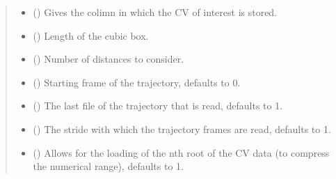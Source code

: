 \documentclass[a4paper,10pt,english]{report}
\begin{document}
\begin{fulllineitems}
\begin{quote}
\begin{description}
\begin{itemize}
\item {} 
\sphinxAtStartPar
{} () \textendash{} Gives the colimn in which the CV of interest is stored.

\item {} 
\sphinxAtStartPar
{} () \textendash{} Length of the cubic box.

\item {} 
\sphinxAtStartPar
{} () \textendash{} Number of distances to consider.

\item {} 
\sphinxAtStartPar
{} (\sphinxstyleliteralemphasis{\sphinxupquote{, }}) \textendash{} Starting frame of the trajectory, defaults to 0.

\item {} 
\sphinxAtStartPar
{} (\sphinxstyleliteralemphasis{\sphinxupquote{, }}) \textendash{} The last file of the trajectory that is read, defaults to \sphinxhyphen{}1.

\item {} 
\sphinxAtStartPar
{} (\sphinxstyleliteralemphasis{\sphinxupquote{, }}) \textendash{} The stride with which the trajectory frames are read, defaults to 1.

\item {} 
\sphinxAtStartPar
{} (\sphinxstyleliteralemphasis{\sphinxupquote{, }}) \textendash{} Allows for the loading of the n\sphinxhyphen{}th root of the CV data (to compress the numerical range), defaults to 1.

\end{itemize}

\end{description}\end{quote}

\end{fulllineitems}
\end{document}
